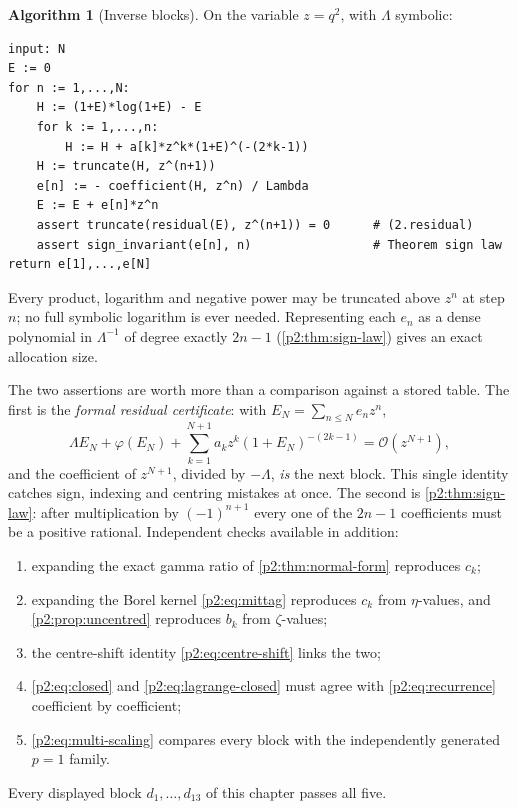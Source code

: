 \documentclass[11pt,a4paper,oneside]{book}
\theoremstyle{plain}
\theoremstyle{definition}
\newtheorem{algorithm}[theorem]{Algorithm}
\theoremstyle{remark}
\newcommand{\bigO}{\mathcal{O}}
\begin{document}
\begin{algorithm}[Inverse blocks]
\label{p2:alg:inverse}
On the variable \(z=q^2\), with \(\Lambda\) symbolic:
\begin{lstlisting}
input: N
E := 0
for n := 1,...,N:
    H := (1+E)*log(1+E) - E
    for k := 1,...,n:
        H := H + a[k]*z^k*(1+E)^(-(2*k-1))
    H := truncate(H, z^(n+1))
    e[n] := - coefficient(H, z^n) / Lambda
    E := E + e[n]*z^n
    assert truncate(residual(E), z^(n+1)) = 0      # (2.residual)
    assert sign_invariant(e[n], n)                 # Theorem sign law
return e[1],...,e[N]
\end{lstlisting}
Every product, logarithm and negative power may be truncated above \(z^n\) at
step \(n\); no full symbolic logarithm is ever needed.  Representing each
\(e_n\) as a dense polynomial in \(\Lambda^{-1}\) of degree exactly \(2n-1\)
(\cref{p2:thm:sign-law}) gives an exact allocation size.
\end{algorithm}

The two assertions are worth more than a comparison against a stored table.
The first is the \emph{formal residual certificate}: with
\(E_N=\sum_{n\le N}e_nz^n\),
\begin{equation}
 \Lambda E_N+\varphi(E_N)
 +\sum_{k=1}^{N+1}a_kz^k(1+E_N)^{-(2k-1)}
 =\bigO\!\left(z^{N+1}\right),
 \label{p2:eq:residual-certificate}
\end{equation}
and the coefficient of \(z^{N+1}\), divided by \(-\Lambda\), \emph{is} the next
block.  This single identity catches sign, indexing and centring mistakes at
once.  The second is \cref{p2:thm:sign-law}: after multiplication by
\((-1)^{n+1}\) every one of the \(2n-1\) coefficients must be a positive
rational.  Independent checks available in addition:
\begin{enumerate}[label=\textup{(\arabic*)}]
\item expanding the exact gamma ratio of \cref{p2:thm:normal-form} reproduces
      \(c_k\);
\item expanding the Borel kernel \cref{p2:eq:mittag} reproduces \(c_k\) from
      \(\eta\)-values, and \cref{p2:prop:uncentred} reproduces \(b_k\) from
      \(\zeta\)-values;
\item the centre-shift identity \cref{p2:eq:centre-shift} links the two;
\item \cref{p2:eq:closed} and \cref{p2:eq:lagrange-closed} must agree with
      \cref{p2:eq:recurrence} coefficient by coefficient;
\item \cref{p2:eq:multi-scaling} compares every block with the independently
      generated \(p=1\) family.
\end{enumerate}
Every displayed block \(d_1,\dots,d_{13}\) of this chapter passes all five.
\end{document}
